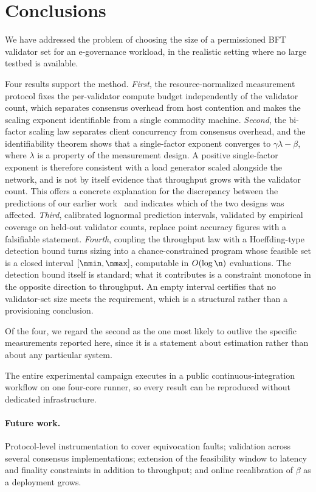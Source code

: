 \section{Conclusions}
\label{sec:conclusions}

We have addressed the problem of choosing the size of a permissioned BFT
validator set for an e-governance workload, in the realistic setting where no
large testbed is available.

Four results support the method.
\emph{First}, the resource-normalized measurement protocol fixes the
per-validator compute budget independently of the validator count, which
separates consensus overhead from host contention and makes the scaling exponent
identifiable from a single commodity machine.
\emph{Second}, the bi-factor scaling law separates client concurrency from
consensus overhead, and the identifiability theorem shows that a single-factor
exponent converges to $\gamma\lambda-\beta$, where $\lambda$ is a property of the
measurement design. A positive single-factor exponent is therefore consistent
with a load generator scaled alongside the network, and is not by itself
evidence that throughput grows with the validator count. This offers a concrete
explanation for the discrepancy between the predictions of our earlier
work~\cite{peniak2026a,peniak2026b} and indicates which of the two designs was
affected.
\emph{Third}, calibrated lognormal prediction intervals, validated by empirical
coverage on held-out validator counts, replace point accuracy figures with a
falsifiable statement.
\emph{Fourth}, coupling the throughput law with a Hoeffding-type detection bound
turns sizing into a chance-constrained program whose feasible set is a closed
interval $[\nmin,\nmax]$, computable in $O(\log\n)$ evaluations. The detection
bound itself is standard; what it contributes is a constraint monotone in the
opposite direction to throughput. An empty interval certifies that no
validator-set size meets the requirement, which is a structural rather than a
provisioning conclusion.

Of the four, we regard the second as the one most likely to outlive the specific
measurements reported here, since it is a statement about estimation rather than
about any particular system.

The entire experimental campaign executes in a public continuous-integration
workflow on one four-core runner, so every result can be reproduced without
dedicated infrastructure.

\paragraph{Future work.}
Protocol-level instrumentation to cover equivocation faults; validation across
several consensus implementations; extension of the feasibility window to
latency and finality constraints in addition to throughput; and online
recalibration of $\beta$ as a deployment grows.

